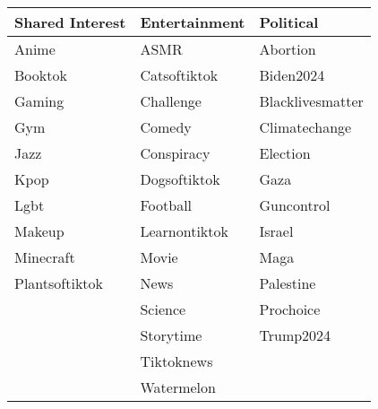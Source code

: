 \begin{tabular}{|l|l|l|}
    \hline
    \textbf{Shared Interest} & \textbf{Entertainment} & \textbf{Political} \\ \hline
    Anime & ASMR & Abortion \\ \hline
    Booktok & Catsoftiktok & Biden2024 \\ \hline
    Gaming & Challenge & Blacklivesmatter \\ \hline
    Gym & Comedy & Climatechange \\ \hline
    Jazz & Conspiracy & Election \\ \hline
    Kpop & Dogsoftiktok & Gaza \\ \hline
    Lgbt & Football & Guncontrol \\ \hline
    Makeup & Learnontiktok & Israel \\ \hline
    Minecraft & Movie & Maga \\ \hline
    Plantsoftiktok & News & Palestine \\ \hline
    & Science & Prochoice \\ \hline
    & Storytime & Trump2024 \\ \hline
    & Tiktoknews & \\ \hline
    & Watermelon & \\ \hline
\end{tabular}


